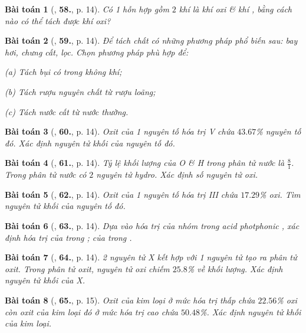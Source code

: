 \documentclass{article}
\numberwithin{equation}{section}
\newtheorem{baitoan}{Bài toán}[section]
\begin{document}
\begin{baitoan}[\cite{An2011}, \textbf{58.}, p. 14]
	Có 1 hỗn hợp gồm $2$ khí là khí oxi \& khí , bằng cách nào có  thể tách được khí oxi?
\end{baitoan}

\begin{baitoan}[\cite{An2011}, \textbf{59.}, p. 14]
	Để tách chất có những phương pháp phổ biến sau: bay hơi, chưng cất, lọc. Chọn phương pháp phù hợp để:
	\begin{enumerate*}
		\item[(a)] Tách bụi có trong không khí;
		\item[(b)] Tách rượu nguyên chất từ rượu loãng;
		\item[(c)] Tách nước cất từ nước thường.
	\end{enumerate*}
\end{baitoan}

\begin{baitoan}[\cite{An2011}, \textbf{60.}, p. 14]
	Oxit của 1 nguyên tố hóa trị V chứa $43.67$\% nguyên tố đó. Xác định nguyên tử khối của nguyên tố đó.
\end{baitoan}

\begin{baitoan}[\cite{An2011}, \textbf{61.}, p. 14]
	Tỷ lệ khối lượng của O \& H trong phân tử nước là $\frac{8}{1}$. Trong phân tử nước có $2$ nguyên tử hydro. Xác định số nguyên tử oxi.
\end{baitoan}

\begin{baitoan}[\cite{An2011}, \textbf{62.}, p. 14]
	Oxit của 1 nguyên tố hóa trị III chứa $17.29$\% oxi. Tìm nguyên tử khối của nguyên tố đó.
\end{baitoan}

\begin{baitoan}[\cite{An2011}, \textbf{63.}, p. 14]
	Dựa vào hóa trị của nhóm  trong acid photphonic , xác định hóa trị của  trong ; của  trong .
\end{baitoan}

\begin{baitoan}[\cite{An2011}, \textbf{64.}, p. 14]
	2 nguyên tử X kết hợp với 1 nguyên tử  tạo ra phân tử oxit. Trong phân tử oxit, nguyên tử oxi chiếm $25.8$\% về khối lượng. Xác định nguyên tử khối của X.
\end{baitoan}

\begin{baitoan}[\cite{An2011}, \textbf{65.}, p. 15]
	Oxit của kim loại ở mức hóa trị thấp chứa $22.56$\% oxi còn oxit của kim loại đó ở mức hóa trị cao chứa $50.48$\%. Xác định nguyên tử khối của kim loại.
\end{baitoan}
\end{document}
